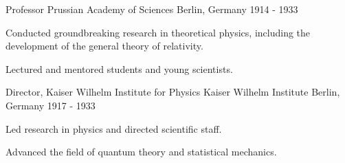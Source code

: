 \vspace{6pt}

\vspace{3pt}

\begin{cventries}

  \cventry
    {Professor} %
    {Prussian Academy of Sciences} %
    {Berlin, Germany} %
    {1914 - 1933} %
    {
      \begin{cvitems}
        \item {Conducted groundbreaking research in theoretical physics, 
        including the development of the general theory of relativity.}
        \item {Lectured and mentored students and young scientists.}
      \end{cvitems}
    }


  \cventry
    {Director, Kaiser Wilhelm Institute for Physics} %
    {Kaiser Wilhelm Institute} %
    {Berlin, Germany} %
    {1917 - 1933} %
    {
      \begin{cvitems}
        \item {Led research in physics and directed scientific staff.}
        \item {Advanced the field of quantum theory and statistical mechanics.}
      \end{cvitems}
    }


\end{cventries}

\vspace{3pt}

